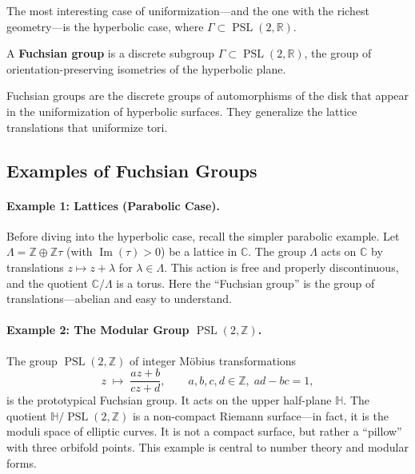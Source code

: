 The most interesting case of uniformization---and the one with the richest geometry---is the hyperbolic case, where $\Gamma \subset \operatorname{PSL}(2,\mathbb{R})$.

\begin{definition}
A \textbf{Fuchsian group} is a discrete subgroup $\Gamma \subset \operatorname{PSL}(2,\mathbb{R})$, the group of orientation-preserving isometries of the hyperbolic plane.
\end{definition}

Fuchsian groups are the discrete groups of automorphisms of the disk that appear in the uniformization of hyperbolic surfaces. They generalize the lattice translations that uniformize tori.

\subsection{Examples of Fuchsian Groups}

\paragraph{Example 1: Lattices (Parabolic Case).}
Before diving into the hyperbolic case, recall the simpler parabolic example. Let $\Lambda = \mathbb{Z} \oplus \mathbb{Z}\tau$ (with $\operatorname{Im}(\tau) > 0$) be a lattice in $\mathbb{C}$. The group $\Lambda$ acts on $\mathbb{C}$ by translations $z \mapsto z + \lambda$ for $\lambda \in \Lambda$. This action is free and properly discontinuous, and the quotient $\mathbb{C}/\Lambda$ is a torus. Here the ``Fuchsian group'' is the group of translations---abelian and easy to understand.

\paragraph{Example 2: The Modular Group $\operatorname{PSL}(2,\mathbb{Z})$.}
The group $\operatorname{PSL}(2,\mathbb{Z})$ of integer M\"obius transformations
\[
    z \;\mapsto\; \frac{az + b}{cz + d}, \qquad a,b,c,d \in \mathbb{Z},\; ad - bc = 1,
\]
is the prototypical Fuchsian group. It acts on the upper half-plane $\mathbb{H}$. The quotient $\mathbb{H}/\operatorname{PSL}(2,\mathbb{Z})$ is a non-compact Riemann surface---in fact, it is the moduli space of elliptic curves. It is not a compact surface, but rather a ``pillow'' with three orbifold points. This example is central to number theory and modular forms.

